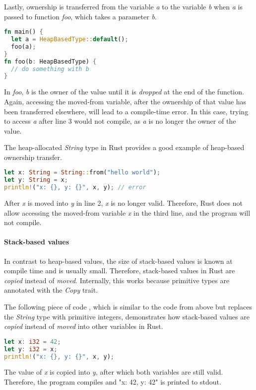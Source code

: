 \documentclass[sigplan,11pt,nonacm]{acmart}
\begin{document}
Lastly, ownership is transferred from the variable \emph{a} to the variable \emph{b} when \emph{a} is passed to function \emph{foo}, which takes a parameter \emph{b}.
\begin{lstlisting}[language=Rust]
fn main() {
  let a = HeapBasedType::default();
  foo(a);
}
fn foo(b: HeapBasedType) {
  // do something with b
}
\end{lstlisting}
In \emph{foo}, \emph{b} is the owner of the value until it is \emph{dropped} at the end of the function.
Again, accessing the moved-from variable, after the ownership of that value has been transferred elsewhere, will lead to a compile-time error.
In this case, trying to access \emph{a} after line 3 would not compile, as \emph{a} is no longer the owner of the value.

The heap-allocated \emph{String} type in Rust provides a good example of heap-based ownership transfer.
\begin{lstlisting}[language=Rust]
let x: String = String::from("hello world");
let y: String = x;
println!("x: {}, y: {}", x, y); // error
\end{lstlisting}
After \emph{x} is moved into \emph{y} in line 2, \emph{x} is no longer valid.
Therefore, Rust does not allow accessing the moved-from variable \emph{x} in the third line, and the program will not compile.


\paragraph{Stack-based values}

In contrast to heap-based values, the size of stack-based values is known at compile time and is usually small.
Therefore, stack-based values in Rust are \emph{copied} instead of \emph{moved}.
Internally, this works because primitive types are annotated with the \emph{Copy} trait.

The following piece of code \cite{rust-book}, which is similar to the code from above but replaces the \emph{String} type with primitive integers, demonstrates how stack-based values are \emph{copied} instead of \emph{moved} into other variables in Rust.
\begin{lstlisting}[language=Rust]
let x: i32 = 42;
let y: i32 = x;
println!("x: {}, y: {}", x, y);
\end{lstlisting}
The value of \emph{x} is copied into \emph{y}, after which both variables are still valid.
Therefore, the program compiles and "x: 42, y: 42" is printed to stdout.
\end{document}
